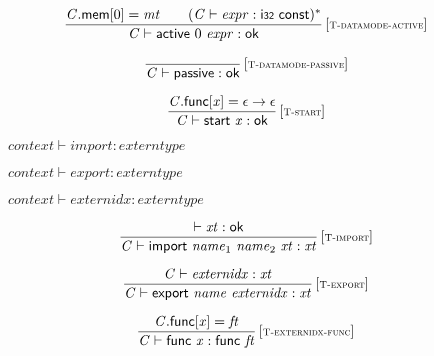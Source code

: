 $$
\begin{array}{@{}c@{}}\displaystyle
\frac{
{\mathit{C}}.\mathsf{mem}{}[0] = {\mathit{mt}}
 \qquad
({\mathit{C}} \vdash {\mathit{expr}} : \mathsf{i{\scriptstyle32}}~\mathsf{const})^\ast
}{
{\mathit{C}} \vdash \mathsf{active}~0~{\mathit{expr}} : \mathsf{ok}
} \, {[\textsc{\scriptsize T{-}datamode{-}active}]}
\qquad
\end{array}
$$

$$
\begin{array}{@{}c@{}}\displaystyle
\frac{
}{
{\mathit{C}} \vdash \mathsf{passive} : \mathsf{ok}
} \, {[\textsc{\scriptsize T{-}datamode{-}passive}]}
\qquad
\end{array}
$$

$$
\begin{array}{@{}c@{}}\displaystyle
\frac{
{\mathit{C}}.\mathsf{func}{}[{\mathit{x}}] = \epsilon \rightarrow \epsilon
}{
{\mathit{C}} \vdash \mathsf{start}~{\mathit{x}} : \mathsf{ok}
} \, {[\textsc{\scriptsize T{-}start}]}
\qquad
\end{array}
$$

\vspace{1ex}

$\boxed{{\mathit{context}} \vdash {\mathit{import}} : {\mathit{externtype}}}$

$\boxed{{\mathit{context}} \vdash {\mathit{export}} : {\mathit{externtype}}}$

$\boxed{{\mathit{context}} \vdash {\mathit{externidx}} : {\mathit{externtype}}}$

$$
\begin{array}{@{}c@{}}\displaystyle
\frac{
{ \vdash }\;{\mathit{xt}} : \mathsf{ok}
}{
{\mathit{C}} \vdash \mathsf{import}~{\mathit{name}}_{{1}}~{\mathit{name}}_{{2}}~{\mathit{xt}} : {\mathit{xt}}
} \, {[\textsc{\scriptsize T{-}import}]}
\qquad
\end{array}
$$

$$
\begin{array}{@{}c@{}}\displaystyle
\frac{
{\mathit{C}} \vdash {\mathit{externidx}} : {\mathit{xt}}
}{
{\mathit{C}} \vdash \mathsf{export}~{\mathit{name}}~{\mathit{externidx}} : {\mathit{xt}}
} \, {[\textsc{\scriptsize T{-}export}]}
\qquad
\end{array}
$$

\vspace{1ex}

$$
\begin{array}{@{}c@{}}\displaystyle
\frac{
{\mathit{C}}.\mathsf{func}{}[{\mathit{x}}] = {\mathit{ft}}
}{
{\mathit{C}} \vdash \mathsf{func}~{\mathit{x}} : \mathsf{func}~{\mathit{ft}}
} \, {[\textsc{\scriptsize T{-}externidx{-}func}]}
\qquad
\end{array}
$$

